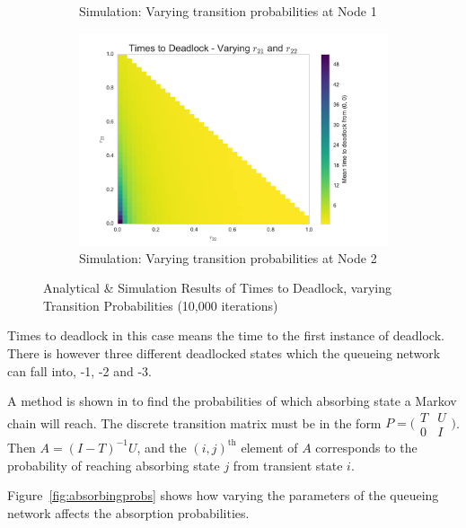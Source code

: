 \documentclass{article}
\begin{document}
\begin{figure}[H]
\begin{subfigure}[b]{0.5\textwidth}
  \caption{Simulation: Varying transition probabilities at Node 1}
  \label{fig:heatmap_sim_1}
\end{subfigure}
\begin{subfigure}[b]{0.5\textwidth}
  \includegraphics[width=\textwidth]{images/N2_heatmap_sim}
  \caption{Simulation: Varying transition probabilities at Node 2}
  \label{fig:heatmap_sim_2}
\end{subfigure}
\caption{Analytical \& Simulation Results of Times to Deadlock, varying Transition Probabilities (10,000 iterations)}
\label{fig:heatmaps}
\end{figure}

Times to deadlock in this case means the time to the first instance of deadlock.
There is however three different deadlocked states which the queueing network can fall into, -1, -2 and -3.

A method is shown in \cite{stewart09} to find the probabilities of which absorbing state a Markov chain will reach.
The discrete transition matrix must be in the form $P = \bigl(\begin{smallmatrix} T & U\\ 0 & I \end{smallmatrix} \bigr)$.
Then $A = (I - T)^{-1}U$, and the $(i, j)^{\text{th}}$ element of $A$ corresponds to the probability of reaching absorbing state $j$ from transient state $i$.

Figure~\ref{fig:absorbingprobs} shows how varying the parameters of the queueing network affects the absorption probabilities.
\end{document}
